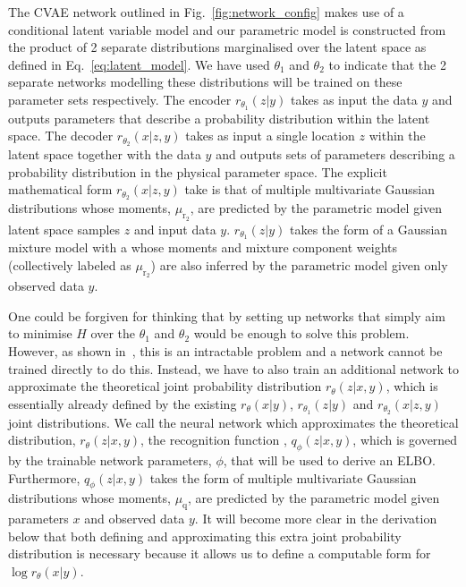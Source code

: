 %
%
The \ac{CVAE} network outlined in Fig.~\ref{fig:network_config} makes use of a conditional 
latent variable model and our parametric model is constructed from the product of 2 
separate distributions marginalised over the latent space as defined in Eq.~\ref{eq:latent_model}. 
We have used $\theta_{1}$ and $\theta_{2}$ to indicate that the 2 separate networks 
modelling these distributions will be trained on these parameter sets respectively. 
The encoder $r_{\theta_1}(z|y)$ takes as input the data $y$ and outputs parameters 
that describe a probability distribution within the latent space. The decoder 
$r_{\theta_2}(x|z,y)$ takes as input a single location $z$ within the latent space 
together with the data $y$ and outputs sets of parameters describing a probability 
distribution in the physical parameter space.
%
%
The explicit mathematical form $r_{\theta_2}(x|z,y)$ take is that of 
multiple multivariate Gaussian distributions whose moments, $\mu_{\mathrm{r}_2}$, are 
predicted by the parametric model given latent space samples $z$ and input data $y$.  
$r_{\theta_1}(z|y)$ takes the form of a Gaussian mixture 
model with a whose moments and mixture component weights (collectively labeled as 
$\mu_{\mathrm{r}_2}$) are also inferred by the parametric 
model given only observed data $y$.

%
%
One could be forgiven for thinking that by setting up networks that 
simply aim to 
minimise $H$ over the $\theta_{1}$ and $\theta_{2}$ would be 
enough to solve this 
problem. However, as shown in~\cite{NIPS2015_5775}, this 
is an intractable problem and a 
network cannot be trained directly to do this. Instead, we have 
to also train an additional network to approximate the theoretical 
joint probability distribution $r_{\theta}(z|x,y)$, which is essentially 
already defined by the existing $r_{\theta}(x|y)$, $r_{\theta_1}(z|y)$ 
and $r_{\theta_2}(x|z,y)$ joint distributions. We call the 
neural network which approximates the theoretical distribution,
 $r_{\theta}(z|x,y)$, the recognition 
function , $q_{\phi}(z|x,y)$, which is governed by the 
trainable network parameters, $\phi$, that will be used to derive an \ac{ELBO}. 
Furthermore, $q_{\phi}(z|x,y)$ takes the form of 
multiple multivariate Gaussian distributions 
whose moments, $\mu_{\mathrm{q}}$, are predicted by the parametric model given 
parameters $x$ and observed data $y$. It will become more clear in the 
derivation below that both defining and approximating this extra joint 
probability distribution is necessary because it allows us to define 
a computable form for $\log r_{\theta}(x|y)$. 

